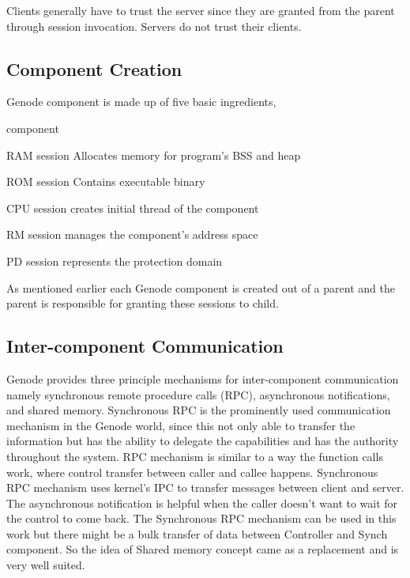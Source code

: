 Clients generally have to trust the server since they are granted from the parent through session invocation. %
Servers do not trust their clients. 

 
\subsection{Component Creation}
Genode component is made up of five basic ingredients, 

\begin{labeling}{component}
\item[RAM session] Allocates memory for program's BSS and heap
\item[ROM session] Contains executable binary
\item[CPU session] creates initial thread of the component
\item[RM session] manages the component's address space 
\item[PD session] represents the protection domain
\end{labeling}

As mentioned earlier each Genode component is created out of a parent and the parent is responsible for granting these sessions to child. 

\subsection{Inter-component Communication}\label{Foundations:icc}
Genode provides three principle mechanisms for inter-component communication namely synchronous remote procedure calls (RPC), asynchronous notifications, and
shared memory. Synchronous RPC is the prominently used communication mechanism in the Genode world, since this not only able to transfer the information but has the ability to delegate the capabilities and has the authority throughout the system. 
RPC mechanism is similar to a way the function calls work, where control transfer between caller and callee happens. Synchronous RPC mechanism uses kernel's IPC to transfer messages between client and server. The asynchronous notification is helpful when the caller doesn't want to wait for the control to come back. The Synchronous RPC mechanism can be used in this work but there might be a bulk transfer of data between Controller and Synch component. So the idea of Shared memory concept came as a replacement and is very well suited.

